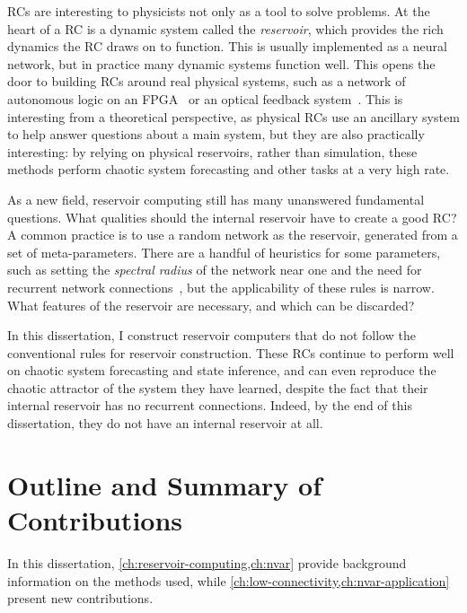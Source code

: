 RCs are interesting to physicists not only as a tool to solve
problems. At the heart of a RC is a dynamic system called the
\emph{reservoir}, which provides the rich dynamics the RC draws on to
function. This is usually implemented as a neural network, but in
practice many dynamic systems function well. This opens the door to
building RCs around real physical systems, such as a network of
autonomous logic on an FPGA~\cite{canaday2018} or an optical feedback
system~\cite{antonik2016}. This is interesting from a theoretical
perspective, as physical RCs use an ancillary system to help answer
questions about a main system, but they are also practically
interesting: by relying on physical reservoirs, rather than
simulation, these methods perform chaotic system forecasting and other
tasks at a very high rate.

As a new field, reservoir computing still has many unanswered
fundamental questions. What qualities should the internal reservoir
have to create a good RC? A common practice is to use a random network
as the reservoir, generated from a set of meta-parameters. There are a
handful of heuristics for some parameters, such as setting the
\emph{spectral radius} of the network near one and the need for
recurrent network connections~\cite{jaeger2001,lukosevicius2012}, but
the applicability of these rules is narrow. What features of the
reservoir are necessary, and which can be discarded?

In this dissertation, I construct reservoir computers that do not
follow the conventional rules for reservoir construction. These RCs
continue to perform well on chaotic system forecasting and state
inference, and can even reproduce the chaotic attractor of the system
they have learned, despite the fact that their internal reservoir has
no recurrent connections. Indeed, by the end of this dissertation, they do
not have an internal reservoir at all.

\section{Outline and Summary of Contributions}

In this dissertation, \cref{ch:reservoir-computing,ch:nvar} provide
background information on the methods used, while
\cref{ch:low-connectivity,ch:nvar-application} present new
contributions.

